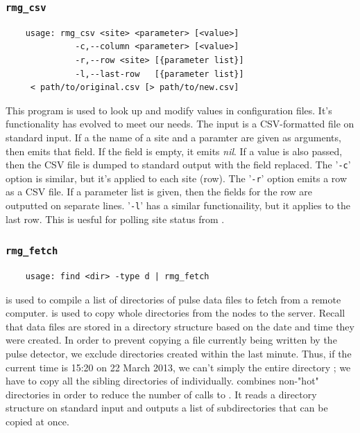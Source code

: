 \documentclass[letter]{article}
\begin{document}
\subsubsection{\texttt{rmg\_csv}}
\begin{verbatim}
    usage: rmg_csv <site> <parameter> [<value>] 
              -c,--column <parameter> [<value>] 
              -r,--row <site> [{parameter list}]
              -l,--last-row   [{parameter list}]
     < path/to/original.csv [> path/to/new.csv]
\end{verbatim}
This program is used to look up and modify values in configuration files. It's functionality
has evolved to meet our needs. The input is a CSV-formatted file on standard input. If a 
the name of a site and a paramter are given as arguments, then  emits that 
field. If the field is empty, it emits \textit{nil}. If a value is also passed, then 
the CSV file is dumped to standard output with 
the field replaced. The '\texttt{-c}' option is similar, but it's applied to each site (row). 
The '\texttt{-r}' option emits a row as a CSV file. If a parameter list is given, then 
the fields for the row are outputted on separate lines. '\texttt{-l}' has a similar 
functionaility, but it applies to the last row. This is uesful for polling site status
from .


\subsubsection{\texttt{rmg\_fetch}}
\begin{verbatim}
    usage: find <dir> -type d | rmg_fetch 
\end{verbatim}
 is used to compile a list of directories of pulse data files to fetch
from a remote computer.  is used to copy whole directories from the nodes 
to the server. Recall that data files are stored in a directory structure 
based on the date and time they were created. In order to prevent copying a file currently 
being written by the pulse detector, we exclude directories created within the 
last minute. Thus, if the current time is 15:20 on 22 March 2013, we can't simply 
the entire directory ; we have to copy all the sibling
directories of  individually. 
combines non-"hot" directories in order to reduce the number of calls to . It reads
a directory structure on standard input and outputs a list of subdirectories that can be 
copied at once. 
  
\end{document}
